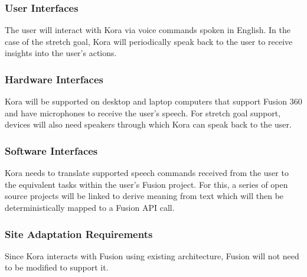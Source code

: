 \documentclass[onecolumn, draftclsnofoot,10pt, compsoc]{IEEEtran}
\def \botname{Kora }
\begin{document}
        \subsubsection{User Interfaces}
            The user will interact with \botname via voice commands spoken in English. 
            In the case of the stretch goal, \botname will periodically speak back to the user to receive insights into the user's actions.

        \subsubsection{Hardware Interfaces} 
            \botname will be supported on desktop and laptop computers that support Fusion 360 and have microphones to receive the user's speech.
            For stretch goal support, devices will also need speakers through which \botname can speak back to the user.

        \subsubsection{Software Interfaces}               
            \botname needs to translate supported speech commands received from the user to the equivalent tasks within the user's Fusion project.
            For this, a series of open source projects will be linked to derive meaning from text which will then be deterministically mapped to a Fusion API call.


        \subsubsection{Site Adaptation Requirements} 
            Since \botname interacts with Fusion using existing architecture, Fusion will not need to be modified to support it. 
\end{document}
